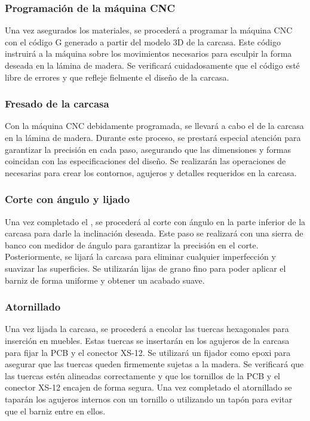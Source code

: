 \subsubsection{Programación de la máquina \gls{CNC}}
Una vez asegurados los materiales, se procederá a programar la máquina \gls{CNC} con el código G generado a partir del modelo 3D de la carcasa. Este código instruirá a la máquina sobre los movimientos necesarios para esculpir la forma deseada en la lámina de madera. Se verificará cuidadosamente que el código esté libre de errores y que refleje fielmente el diseño de la carcasa.

\subsubsection{\gls{Fresado} de la carcasa}
Con la máquina \gls{CNC} debidamente programada, se llevará a cabo el  de la carcasa en la lámina de madera. Durante este proceso, se prestará especial atención para garantizar la precisión en cada paso, asegurando que las dimensiones y formas coincidan con las especificaciones del diseño. Se realizarán las operaciones de  necesarias para crear los contornos, agujeros y detalles requeridos en la carcasa.

\subsubsection{Corte con ángulo y lijado}
Una vez completado el , se procederá al corte con ángulo en la parte inferior de la carcasa para darle la inclinación deseada. Este paso se realizará con una sierra de banco con medidor de ángulo para garantizar la precisión en el corte. Posteriormente, se lijará la carcasa para eliminar cualquier imperfección y suavizar las superficies. Se utilizarán lijas de grano fino para poder aplicar el barniz de forma uniforme y obtener un acabado suave.

\subsubsection{Atornillado}
Una vez lijada la carcasa, se procederá a encolar las tuercas hexagonales para inserción en muebles. Estas tuercas se insertarán en los agujeros de la carcasa para fijar la \gls{PCB} y el conector XS-12. Se utilizará un fijador como epoxi para asegurar que las tuercas queden firmemente sujetas a la madera. Se verificará que las tuercas estén alineadas correctamente y que los tornillos de la \gls{PCB} y el conector XS-12 encajen de forma segura. Una vez completado el atornillado se taparán los agujeros internos con un tornillo o utilizando un tapón para evitar que el barniz entre en ellos.

